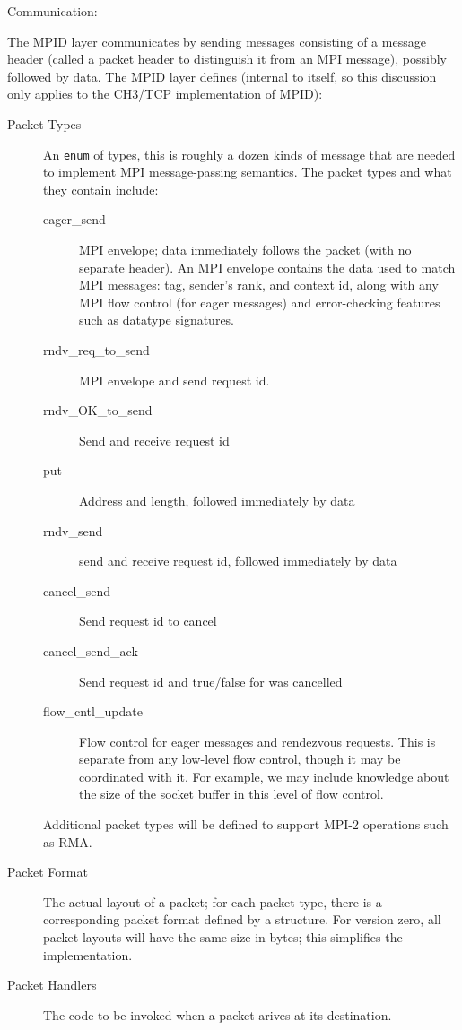 \documentclass{article}
\def\code{\begingroup\makeustext\eatcode}
\def\eatcode#1{\texttt{#1}\endgroup}
\begin{document}
Communication:

The MPID layer communicates by sending messages consisting of a message header
(called a packet header to distinguish it from an MPI message), possibly
followed by data.  The MPID layer defines (internal to itself, so this
discussion only applies to the CH3/TCP implementation of MPID):
\begin{description}
\item[Packet Types]An \code{enum} of types, this is roughly a dozen kinds of
  message that are needed to implement MPI message-passing semantics.  The
  packet types and what they contain include:
  \begin{description}
    \item[eager\_send] MPI envelope; data immediately follows the packet (with
      no separate header).  An MPI envelope contains the data used to match
      MPI messages: tag, sender's rank, and context id, along with any MPI 
      flow control (for eager messages) and error-checking features such as
      datatype signatures.
    \item[rndv\_req\_to\_send]MPI envelope and send request id.
    \item[rndv\_OK\_to\_send]Send and receive request id
    \item[put]Address and length, followed immediately by data
    \item[rndv\_send]send and receive request id, followed immediately by data
    \item[cancel\_send]Send request id to cancel
    \item[cancel\_send\_ack]Send request id and true/false for was cancelled
    \item[flow\_cntl\_update]Flow control for eager messages and rendezvous
      requests.  This is separate from any low-level flow control, though it
      may be coordinated with it.  For example, we may include knowledge about
      the size of the socket buffer in this level of flow control.
    \end{description}
    Additional packet types will be defined to support MPI-2 operations such
    as RMA.
\item[Packet Format]The actual layout of a packet; for each packet type, there
  is a corresponding packet format defined by a structure.  For version zero,
  all packet layouts will have the same size in bytes; this simplifies
  the implementation.
\item[Packet Handlers]The code to be invoked when a packet arives at its
  destination. 
\end{description}
\end{document}
